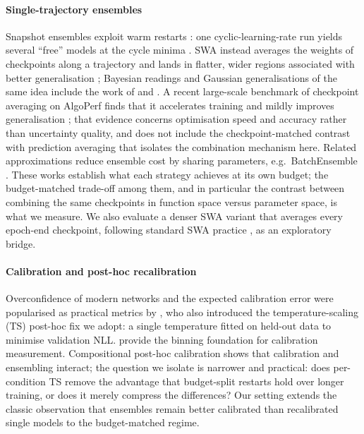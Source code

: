 \documentclass[11pt,a4paper]{article}
\newcommand{\swa}{\textsc{SWA}}
\newcommand{\ts}{\textsc{TS}}
\begin{document}
\paragraph{Single-trajectory ensembles}
Snapshot ensembles exploit warm restarts \citep{loshchilov2017}: one
cyclic-learning-rate run yields several ``free'' models at the cycle minima
\citep{huang2017}. \swa{} instead averages the weights of checkpoints along
a trajectory and lands in flatter, wider regions associated with better
generalisation \citep{izmailov2018}; Bayesian readings and Gaussian
generalisations of the same idea include the work of
\citet{wilson2020} and \citet{maddox2019}. A recent large-scale benchmark
of checkpoint averaging on AlgoPerf finds that it accelerates training and
mildly improves generalisation \citep{ajroldi2025}; that evidence concerns
optimisation speed and accuracy rather than uncertainty quality, and does
not include the checkpoint-matched contrast with prediction averaging that
isolates the combination mechanism here. Related approximations reduce
ensemble cost by sharing parameters, e.g.\ BatchEnsemble
\citep{wen2020}. These works establish what each strategy achieves at its
own budget; the budget-matched trade-off among them, and in particular the
contrast between combining the same checkpoints in function space versus
parameter space, is what we measure. We also evaluate a denser \swa{}
variant that averages every epoch-end checkpoint, following standard \swa{}
practice \citep{izmailov2018}, as an exploratory bridge.

\paragraph{Calibration and post-hoc recalibration}
Overconfidence of modern networks and the expected calibration error were
popularised as practical metrics by \citet{guo2017}, who also introduced the
temperature-scaling (\ts) post-hoc fix we adopt: a single temperature fitted
on held-out data to minimise validation NLL. \citet{naeini2015} provide the
binning foundation for calibration measurement. Compositional post-hoc
calibration \citep{zhang2020} shows that calibration and ensembling
interact; the question we isolate is narrower and practical: does per-condition
\ts{} remove the advantage that budget-split restarts hold over longer
training, or does it merely compress the differences? Our setting extends
the classic observation that ensembles remain better calibrated than
recalibrated single models \citep{lakshminarayanan2017} to the
budget-matched regime.
\end{document}
